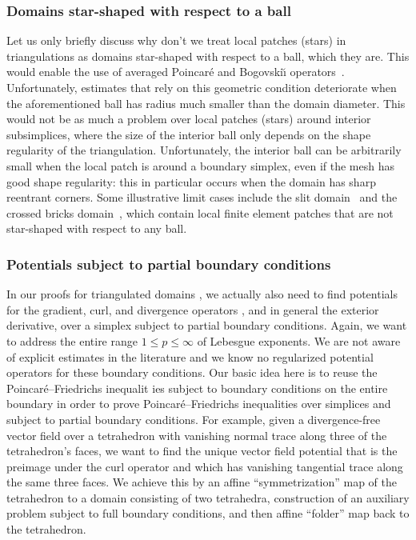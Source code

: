 \documentclass[10pt,letterpaper]{article}
\newcommand\cye[1]{%
  \protect\leavevmode
  \begingroup
    \color{red!35!yellow}%
    #1%
  \endgroup
}
\begin{document}
\subsubsection{\cye{Domains star-shaped with respect to a ball}}

\cye{Let us only briefly discuss why don't we treat local \cye{patches} (stars) in triangulations as} domains star-shaped with respect to a ball, which they are. This \cye{would enable} the use of averaged Poincar\'e and Bogovski\u{\i} operators~\cite{costabel2010bogovskiui}. Unfortunately, estimates that rely on this geometric condition deteriorate when the aforementioned ball has radius much smaller than the domain diameter. 
This \cye{would not be} as much a problem over local patches (stars) around interior subsimplices, where the size of the interior ball only depends on the shape regularity of the triangulation. 
\cye{Unfortunately,} the interior ball can be arbitrarily small when the local patch is around a boundary simplex, even if the mesh has good shape regularity: 
this \cye{in particular} occurs when the domain has sharp reentrant corners. Some illustrative limit cases include the slit domain~\cite{veeser2012poincare} and the crossed bricks domain~\cite{licht2019smoothed}, 
which contain local finite element patches \cye{that} are not star-shaped with respect to any ball. 

\subsubsection{\cye{Potentials subject to partial boundary conditions}}

\cye{In our proofs for triangulated domains}, we \cye{actually also} need to find potentials for the gradient, curl, and divergence operators\cye{, and in general the exterior derivative,} over a simplex subject to partial boundary conditions. 
Again, we want to address the entire range $1 \leq p \leq \infty$ of Lebesgue exponents. 
We are not aware of explicit estimates in the literature and \cye{we know} no regularized potential operators for these boundary conditions. 
\cye{Our basic idea here is to reuse} the Poincar\'e--Friedrichs inequalit\cye{ies} subject to boundary conditions \cye{on the entire boundary in order} to prove Poincar\'e--Friedrichs inequalities over simplices and subject to partial boundary conditions. 
For example, given a divergence-free vector field over a tetrahedron with vanishing normal trace along three of the tetrahedron's faces, we want to find the unique vector field potential that is the preimage under the curl operator and which has vanishing tangential trace along the same three faces. We achieve this by \cye{an affine ``symmetrization'' map of the tetrahedron to a domain consisting of two tetrahedra,} construction of an auxiliary problem subject to full boundary conditions, and then affine ``folder'' map back to the tetrahedron.
\end{document}
